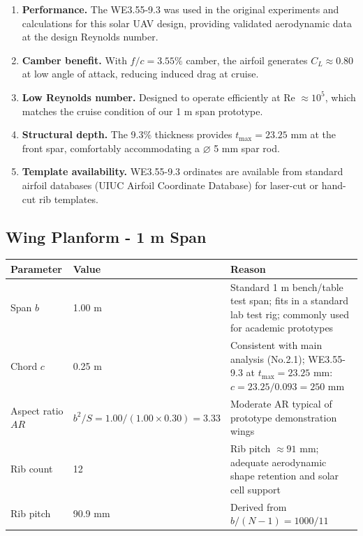 \documentclass[10pt,a4paper]{article}
\begin{document}
\begin{enumerate}[noitemsep,topsep=2pt]
\item \textbf{Performance.} The WE3.55-9.3 was used in the original experiments and calculations for this solar UAV design, providing validated aerodynamic data at the design Reynolds number.
\item \textbf{Camber benefit.} With $f/c = 3.55\%$ camber, the airfoil generates $C_L \approx 0.80$ at low angle of attack, reducing induced drag at cruise.
\item \textbf{Low Reynolds number.} Designed to operate efficiently at Re $\approx 10^5$, which matches the cruise condition of our 1 m span prototype.
\item \textbf{Structural depth.} The 9.3\% thickness provides $t_{\max} = 23.25$ mm at the front spar, comfortably accommodating a $\varnothing$ 5 mm spar rod.
\item \textbf{Template availability.} WE3.55-9.3 ordinates are available from standard airfoil databases (UIUC Airfoil Coordinate Database) for laser-cut or hand-cut rib templates.
\end{enumerate}

\subsection{Wing Planform - 1 m Span}

\begin{center}
\begin{tabularx}{\textwidth}{|l|l|X|}
\hline
Parameter & Value & Reason \\
\hline
Span $b$ & 1.00 m & Standard 1 m bench/table test span; fits in a standard lab test rig; commonly used for academic prototypes \\
\hline
Chord $c$ & 0.25 m & Consistent with main analysis (No.2.1); WE3.55-9.3 at $t_{\max} = 23.25$ mm: $c = 23.25/0.093 = 250$ mm \\
\hline
Aspect ratio $AR$ & $b^{2}/S = 1.00 / (1.00 \times 0.30) = \mathbf{3.33}$ & Moderate AR typical of prototype demonstration wings \\
\hline
Rib count & 12 & Rib pitch $\approx 91$ mm; adequate aerodynamic shape retention and solar cell support \\
\hline
Rib pitch & 90.9 mm & Derived from $b / (N-1) = 1000 / 11$ \\
\hline
\end{tabularx}
\end{center}
\end{document}
